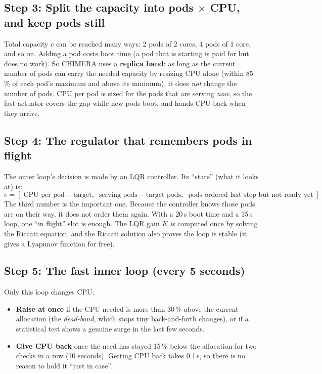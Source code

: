 \documentclass[11pt,a4paper]{article}
\begin{document}
\subsection*{Step 3: Split the capacity into pods $\times$ CPU, and keep pods still}
Total capacity $c$ can be reached many ways: 2 pods of 2 cores, 4 pods of 1 core, and so
on. Adding a pod costs boot time (a pod that is starting is paid for but does no work).
So CHIMERA uses a \textbf{replica band}: as long as the current number of pods can carry
the needed capacity by resizing CPU alone (within 85\,\% of each pod's maximum and above
its minimum), it does \emph{not} change the number of pods. CPU per pod is sized for the
pods that are serving \emph{now}, so the fast actuator covers the gap while new pods boot,
and hands CPU back when they arrive.

\subsection*{Step 4: The regulator that remembers pods in flight}
The outer loop's decision is made by an LQR controller. Its ``state'' (what it looks at)
is:
\[
e = [\;\text{CPU per pod} - \text{target},\;\; \text{serving pods} - \text{target pods},\;\;
\text{pods ordered last step but not ready yet}\;] .
\]
The third number is the important one. Because the controller knows those pods are on
their way, it does not order them again. With a 20\,s boot time and a 15\,s loop, one
``in flight'' slot is enough. The LQR gain $K$ is computed once by solving the Riccati
equation, and the Riccati solution also proves the loop is stable (it gives a Lyapunov
function for free).

\subsection*{Step 5: The fast inner loop (every 5 seconds)}
Only this loop changes CPU:
\begin{itemize}
\item \textbf{Raise at once} if the CPU needed is more than 30\,\% above the current
allocation (the \emph{dead-band}, which stops tiny back-and-forth changes), or if a
statistical test shows a genuine surge in the last few seconds.
\item \textbf{Give CPU back} once the need has stayed 15\,\% below the allocation for two
checks in a row (10 seconds). Getting CPU back takes 0.1\,s, so there is no reason to hold
it ``just in case''.
\end{itemize}
\end{document}
